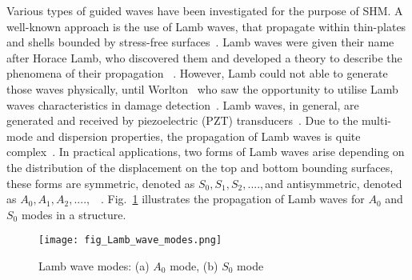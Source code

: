 Various types of guided waves have been investigated for the purpose of SHM. 
A well-known approach is the use of Lamb waves, that propagate 
within thin-plates and shells bounded by stress-free surfaces~\cite{Mitra2016}.
Lamb waves were given their name after Horace Lamb, who discovered them and 
developed a theory to describe the phenomena of their propagation 
~\cite{Ostachowicz2012}. 
However, Lamb could not able to generate those waves physically, until 
Worlton~\cite{Worlton1961} who saw the opportunity to utilise Lamb waves 
characteristics in damage detection~\cite{Ostachowicz2012}.
Lamb waves, in general, are generated and received by piezoelectric (PZT) 
transducers~\cite{Cai2012}.
Due to the multi-mode and dispersion properties, the propagation of Lamb waves 
is quite complex~\cite{Ostachowicz2012}. 
In practical applications, two forms of Lamb waves arise depending on the 
distribution of the displacement on the top and bottom bounding surfaces, these 
forms are symmetric, denoted as \(S_0,S_1,S_2,...., \)and antisymmetric, denoted as 
\(A_0,A_1,A_2,....,\) ~\cite{Ostachowicz2012}. 
Fig.~\ref{fig:LambModes} illustrates the propagation of Lamb waves for \(A_0\) and \(S_0\) modes in a structure.



\begin{figure} [h!]
	\begin{center}
	 	\centering
	\texttt{[image: fig\_Lamb\_wave\_modes.png]}
	\end{center}
	
\caption{Lamb wave modes: (a)  \(A_0 \) mode, (b) \( S_0\) mode}
 
	\label{fig:LambModes}
\end{figure}

\DIFadd{\paragraph{}}

